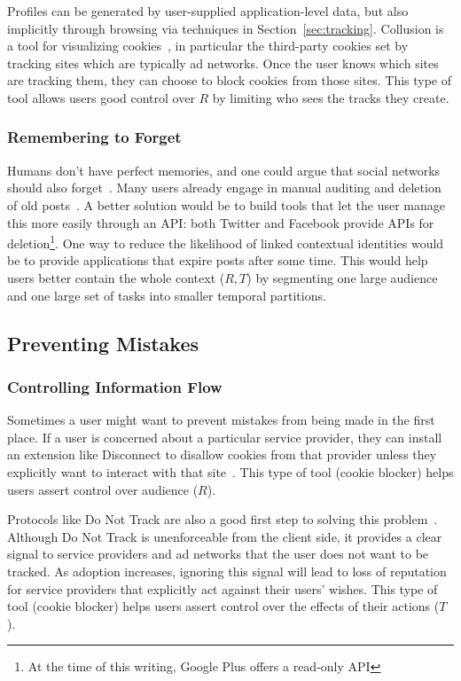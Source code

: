\documentclass{llncs}
\begin{document}
Profiles can be generated by user-supplied application-level data, but also
implicitly through browsing via techniques in Section~\ref{sec:tracking}. Collusion is a
tool for visualizing cookies~\cite{collusion}, in particular the third-party
cookies set by tracking sites which are typically ad networks.  Once the user
knows which sites are tracking them, they can choose to block cookies from
those sites.  This type of tool allows users good control over $R$ by limiting
who sees the tracks they create.

\subsubsection{Remembering to Forget}
Humans don't have perfect memories, and one could argue that social
networks should also forget~\cite{delete}. Many users already engage in manual auditing and
deletion of old posts~\cite{fbtips2}. A better solution would be to build tools
that let the user manage this more easily through an API: both Twitter and Facebook provide
APIs for deletion\footnote{At the time of this writing, Google Plus offers a
read-only API}. One way to reduce the likelihood of linked contextual
identities would be to provide applications that expire posts after some time.
This would help users better contain the whole context ($R,T$) by segmenting
one large audience and one large set of tasks into smaller temporal partitions.

\begin{comment}
\cite{viegas}blogger's expectation of privacy
\end{comment}

\subsection{Preventing Mistakes}
\subsubsection{Controlling Information Flow}
Sometimes a user might want to prevent mistakes from being made in the first
place. If a user is concerned about a particular service provider, they can
install an extension like Disconnect to disallow cookies from that provider
unless they explicitly want to interact with that site~\cite{disconnect}.
This type of tool (cookie blocker) helps users assert control over audience ($R$).

Protocols like Do Not Track are also a good first step to solving this
problem~\cite{dnt}. Although Do Not Track is unenforceable from the client
side, it provides a clear signal to service providers and ad networks
that the user does not want to be tracked. As adoption increases, ignoring this
signal will lead to loss of reputation for service providers that explicitly
act against their users' wishes.
This type of tool (cookie blocker) helps users assert control over the effects of their actions ($T$).
\end{document}
